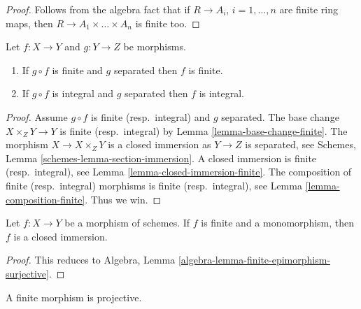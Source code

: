 \begin{proof}
Follows from the algebra fact that if $R \to A_i$, $i = 1, \ldots, n$
are finite ring maps, then $R \to A_1 \times \ldots \times A_n$ is finite too.
\end{proof}

\begin{lemma}
\label{lemma-finite-permanence}
Let $f : X \to Y$ and $g : Y \to Z$ be morphisms.
\begin{enumerate}
\item If $g \circ f$ is finite and $g$ separated then $f$ is finite.
\item If $g \circ f$ is integral and $g$ separated then $f$ is integral.
\end{enumerate}
\end{lemma}

\begin{proof}
Assume $g \circ f$ is finite (resp.\ integral) and $g$ separated.
The base change $X \times_Z Y \to Y$ is finite (resp.\ integral) by
Lemma \ref{lemma-base-change-finite}.
The morphism $X \to X \times_Z Y$ is
a closed immersion as $Y \to Z$ is separated, see
Schemes, Lemma \ref{schemes-lemma-section-immersion}.
A closed immersion is finite (resp.\ integral),
see Lemma \ref{lemma-closed-immersion-finite}.
The composition of finite (resp.\ integral) morphisms is finite
(resp.\ integral),
see Lemma \ref{lemma-composition-finite}. Thus we win.
\end{proof}

\begin{lemma}
\label{lemma-finite-monomorphism-closed}
Let $f : X \to Y$ be a morphism of schemes.
If $f$ is finite and a monomorphism, then $f$ is a closed immersion.
\end{lemma}

\begin{proof}
This reduces to
Algebra, Lemma \ref{algebra-lemma-finite-epimorphism-surjective}.
\end{proof}

\begin{lemma}
\label{lemma-finite-projective}
A finite morphism is projective.
\end{lemma}

